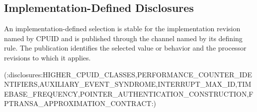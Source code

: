 \subsection{Implementation-Defined Disclosures}

An implementation-defined selection is stable for the implementation revision named by CPUID and is published
through the channel named by its defining rule. The publication identifies the selected value or behavior and the
processor revisions to which it applies.

(:disclosures:HIGHER_CPUID_CLASSES,PERFORMANCE_COUNTER_IDENTIFIERS,AUXILIARY_EVENT_SYNDROME,INTERRUPT_MAX_ID,TIMEBASE_FREQUENCY,POINTER_AUTHENTICATION_CONSTRUCTION,FPTRANSA_APPROXIMATION_CONTRACT:)
